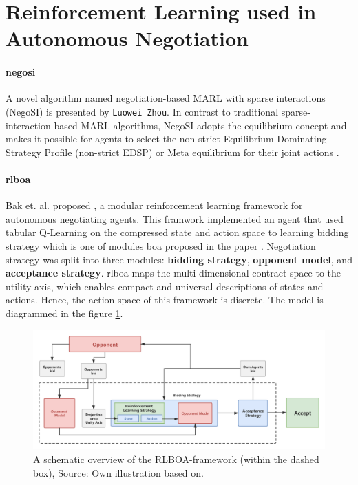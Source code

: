 \section{Reinforcement Learning used in Autonomous Negotiation}
\paragraph{\gls{negosi}} A novel algorithm named negotiation-based MARL
with sparse interactions (NegoSI) is presented by \texttt{Luowei Zhou}. In contrast to traditional sparse-interaction based MARL algorithms, NegoSI adopts the equilibrium concept and makes it possible for agents to select the non-strict Equilibrium Dominating Strategy Profile (non-strict EDSP) or Meta equilibrium for their joint actions \parencite{L2017NegoSI}.

\paragraph{\gls{rlboa}} Bak et. al. proposed \parencite{Bakker2019RLBOAAM}, a modular reinforcement learning framework for autonomous negotiating agents. This framwork implemented an agent that used tabular Q-Learning on the compressed state and action space to learning bidding strategy which is one of modules \gls{boa} proposed in the paper \parencite{Baarslag2014}. Negotiation strategy was split into three modules: \textbf{bidding strategy}, \textbf{opponent model}, and \textbf{acceptance strategy}. \gls{rlboa} maps the multi-dimensional contract space to the utility axis, which enables compact and universal descriptions of states and actions. Hence, the action space of this framework is discrete. The model is diagrammed in the figure \ref{fig:rlboa}.

\begin{figure}[htbp]
\centering
\includegraphics[width=1.0\textwidth]{./images/rlboa.png}
\caption{A schematic overview of the RLBOA-framework (within the dashed box), Source: Own illustration based
on\parencite{Bakker2019RLBOAAM}.}
\label{fig:rlboa}
\end{figure}


